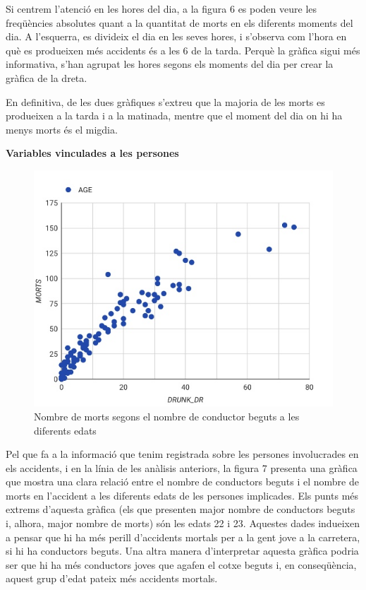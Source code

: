 \documentclass[11pt,longbibliography]{article}
\theoremstyle{definition}
\theoremstyle{remark}
\begin{document}
Si centrem l'atenció en les hores del dia, a la figura 6 es poden veure les freqüències absolutes quant a la quantitat de morts en els diferents moments del dia. A l'esquerra, es divideix el dia en les seves hores, i s'observa com l'hora en què es produeixen més accidents és a les 6 de la tarda. Perquè la gràfica sigui més informativa, s'han agrupat les hores segons els moments del dia per crear la gràfica de la dreta. 


En definitiva, de les dues gràfiques s'extreu que la majoria de les morts es produeixen a la tarda i a la matinada, mentre que el moment del dia on hi ha menys morts és el migdia.


\textbf{Variables vinculades a les persones}

\begin{figure}[H]
\begin{center}
\includegraphics[width=12.5cm]{Graph12}
\end{center}
\caption{Nombre de morts segons el nombre de conductor beguts a les diferents edats}
\label{fig:G3}
\end{figure}


Pel que fa a la informació que tenim registrada sobre les persones involucrades en els accidents, i en la línia de les anàlisis anteriors, la figura 7 presenta una gràfica que mostra una clara relació entre el nombre de conductors beguts i el nombre de morts en l'accident a les diferents edats de les persones implicades. Els punts més extrems d'aquesta gràfica (els que presenten major nombre de conductors beguts i, alhora, major nombre de morts) són les edats 22 i 23. Aquestes dades indueixen a pensar que hi ha més perill d'accidents mortals per a la gent jove a la carretera, si hi ha conductors beguts. Una altra manera d'interpretar aquesta gràfica podria ser que hi ha més conductors joves que agafen el cotxe beguts i, en conseqüència, aquest grup d'edat pateix més accidents mortals.
\end{document}
